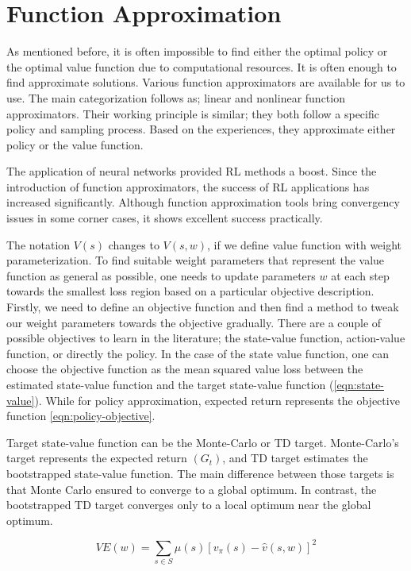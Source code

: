 \section{Function Approximation}
As mentioned before, it is often impossible to find either the optimal policy or the optimal value function due to computational resources. It is often enough to find approximate solutions. Various function approximators are available for us to use. The main categorization follows as; linear and nonlinear function approximators. Their working principle is similar; they both follow a specific policy and sampling process. Based on the experiences, they approximate either policy or the value function. 

The application of neural networks provided RL methods a boost. Since the introduction of function approximators, the success of RL applications has increased significantly. Although function approximation tools bring convergency issues in some corner cases, it shows excellent success practically. 

The notation \(V(s)\) changes to \(V(s, w)\), if we define value function with weight parameterization. To find suitable weight parameters that represent the value function as general as possible, one needs to update parameters \(w\) at each step towards the smallest loss region based on a particular objective description. Firstly, we need to define an objective function and then find a method to tweak our weight parameters towards the objective gradually. 
There are a couple of possible objectives to learn in the literature; the state-value function, action-value function, or directly the policy.
In the case of the state value function, one can choose the objective function as the mean squared value loss between the estimated state-value function and the target state-value function (\ref{eqn:state-value}). While for policy approximation, expected return represents the objective function \ref{eqn:policy-objective}. 

Target state-value function can be the Monte-Carlo or TD target. Monte-Carlo’s target represents the expected return \((G_t)\), and TD target estimates the bootstrapped state-value function. The main difference between those targets is that Monte Carlo ensured to converge to a global optimum. In contrast, the bootstrapped TD target converges only to a local optimum near the global optimum. 

\begin{equation}
    \label{eqn:state-value}
    VE(w) = \sum\limits_{s\in S} \mu(s)[v_\pi(s) - \hat{v}(s,w)]^2
\end{equation}


